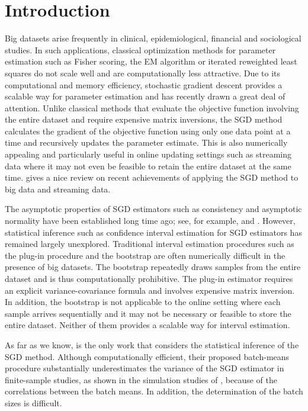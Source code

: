\documentclass[12pt]{article}
\begin{document}
\newpage
\setcounter{equation}{0}

\doublespacing

\section{Introduction}
Big datasets arise frequently in clinical, epidemiological, financial and sociological studies. In such applications,
classical optimization methods for parameter estimation such as Fisher scoring, the EM algorithm or iterated reweighted least squares  \citep{hastie2009elements, nelder1972generalized} do not scale well and are computationally less attractive. Due to its computational and memory efficiency, stochastic gradient descent \citep[SGD]{robbins1951stochastic} provides a scalable way for parameter estimation and has recently drawn a great deal of attention. Unlike classical methods that evaluate the objective function involving the entire dataset and require expensive matrix inversions, the SGD method calculates the gradient of the objective function using only one data point at a time and recursively updates the parameter estimate. This is also numerically appealing and particularly useful in online updating settings such as streaming data where it may not even be feasible to retain the entire dataset at the same time. \cite{wang2015statistical} gives a nice review on recent achievements of applying the SGD method to big data and streaming data.

The asymptotic properties of SGD estimators such as consistency and asymptotic normality have been established long time ago; see, for example, \cite{ruppert1988efficient} and \cite{polyak1992acceleration}. However, statistical inference such as confidence interval estimation for SGD estimators has remained largely unexplored. Traditional interval estimation procedures such as the plug-in procedure and the bootstrap are often numerically difficult in the presence of big datasets. The bootstrap repeatedly draws samples from the entire dataset and is thus computationally prohibitive. The plug-in estimator requires an explicit variance-covariance formula and involves expensive matrix inversion. In addition, the bootstrap is not applicable to the online setting where each sample arrives sequentially and it may not be necessary or feasible to store the entire dataset. Neither of them provides a scalable way for interval estimation.

As far as we know, \cite{chen2016statistical} is the only work that considers the statistical inference of the SGD method. Although computationally efficient, their proposed batch-means procedure substantially underestimates the variance of the SGD estimator in finite-sample studies, as shown in the simulation studies of \cite{chen2016statistical}, because of the correlations between the batch means. In addition, the determination of the batch sizes is difficult.
\end{document}
